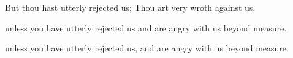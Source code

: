 			\begin{versebox}
					\item[BHS] 
					\item[LXX] 
					\item[ASV] But thou hast utterly rejected us; Thou art very wroth against us.
					\item[NIV] unless you have utterly rejected us and are angry with us beyond measure.
					\item[NRSV] unless you have utterly rejected us, and are angry with us beyond measure.
			\end{versebox}
